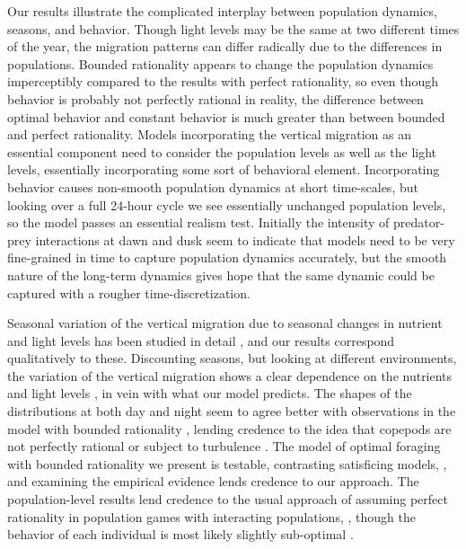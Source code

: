 Our results illustrate the complicated interplay between population dynamics, seasons, and behavior. Though light levels may be the same at two different times of the year, the migration patterns can differ radically due to the differences in populations. Bounded rationality appears to change the population dynamics imperceptibly compared to the results with perfect rationality, so even though behavior is probably not perfectly rational in reality, the difference between optimal behavior and constant behavior is much greater than between bounded and perfect rationality. Models incorporating the vertical migration as an essential component need to consider the population levels as well as the light levels, essentially incorporating some sort of behavioral element. Incorporating behavior causes non-smooth population dynamics at short time-scales, but looking over a full 24-hour cycle we see essentially unchanged population levels, so the model passes an essential realism test. Initially the intensity of predator-prey interactions at dawn and dusk seem to indicate that models need to be very fine-grained in time to capture population dynamics accurately, but the smooth nature of the long-term dynamics gives hope that the same dynamic could be captured with a rougher time-discretization.


Seasonal variation of the vertical migration due to seasonal changes in nutrient and light levels has been studied in detail \citep{wang2014seasonal, beaugrand2001geographical, colebrook1979continuous}, and our results correspond qualitatively to these. Discounting seasons, but looking at different environments, the variation of the vertical migration shows a clear dependence on the nutrients and light levels \citep{klevjer2016large}, in vein with what our model predicts. The shapes of the distributions at both day and night seem to agree better with observations in the model with bounded rationality \citep{hay1991zooplankton}, lending credence to the idea that copepods are not perfectly rational or subject to turbulence \citep{visser2001observations}. The model of optimal foraging with bounded rationality we present is testable, contrasting satisficing models,
\citep{nonacs1993satisficing}, and examining the empirical evidence lends credence to our approach. The population-level results lend credence to the usual approach of assuming perfect
rationality in population games with interacting populations, \citep{kvrivan2008ideal}, though the behavior of each individual is most likely slightly sub-optimal
\citep{hurly1999context}.

